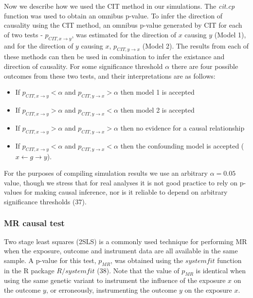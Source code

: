 \documentclass[]{article}
\providecommand{\tightlist}{%
  \setlength{\itemsep}{0pt}\setlength{\parskip}{0pt}}
\begin{document}
Now we describe how we used the CIT method in our simulations. The
\emph{cit.cp} function was used to obtain an omnibus p-value. To infer
the direction of causality using the CIT method, an omnibus p-value
generated by CIT for each of two tests - \(p_{CIT, x \rightarrow y}\),
was estimated for the direction of \(x\) causing \(y\) (Model 1), and
for the direction of \(y\) causing \(x\), \(p_{CIT, y \rightarrow x}\)
(Model 2). The results from each of these methods can then be used in
combination to infer the existance and direction of causality. For some
significance threshold \(\alpha\) there are four possible outcomes from
these two tests, and their interpretations are as follows:

\begin{itemize}
\tightlist
\item
  If \(p_{CIT, x \rightarrow y} < \alpha\) and
  \(p_{CIT, y \rightarrow x} > \alpha\) then model 1 is accepted
\item
  If \(p_{CIT, x \rightarrow y} > \alpha\) and
  \(p_{CIT, y \rightarrow x} < \alpha\) then model 2 is accepted
\item
  If \(p_{CIT, x \rightarrow y} > \alpha\) and
  \(p_{CIT, y \rightarrow x} > \alpha\) then no evidence for a causal
  relationship
\item
  If \(p_{CIT, x \rightarrow y} < \alpha\) and
  \(p_{CIT, y \rightarrow x} < \alpha\) then the confounding model is
  accepted (\(x \leftarrow g \rightarrow y\)).
\end{itemize}

For the purposes of compiling simulation results we use an arbitrary
\(\alpha = 0.05\) value, though we stress that for real analyses it is
not good practice to rely on p-values for making causal inference, nor
is it reliable to depend on arbitrary significance thresholds (37).

\subsubsection{MR causal test}\label{mr-causal-test}

Two stage least squares (2SLS) is a commonly used technique for
performing MR when the exposure, outcome and instrument data are all
available in the same sample. A p-value for this test, \(p_{MR}\), was
obtained using the \(systemfit\) function in the R package
\(R/systemfit\) (38). Note that the value of \(p_{MR}\) is identical
when using the same genetic variant to instrument the influence of the
exposure \(x\) on the outcome \(y\), or erroneously, instrumenting the
outcome \(y\) on the exposure \(x\).
\end{document}
